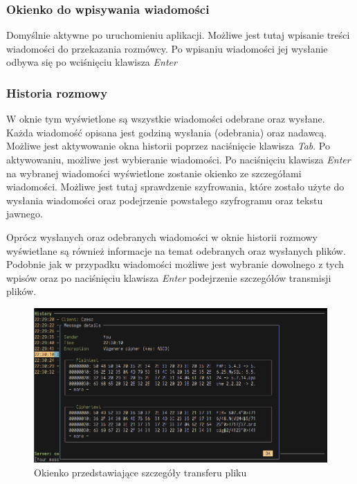 \documentclass{article}
\begin{document}
    \subsubsection{Okienko do wpisywania wiadomości}
      Domyślnie aktywne po uruchomieniu aplikacji. Możliwe jest tutaj wpisanie treści wiadomości do przekazania
      rozmówcy. Po wpisaniu wiadomości jej wysłanie odbywa się po wciśnięciu klawisza \emph{Enter}
    \subsubsection{Historia rozmowy}
      W oknie tym wyświetlone są wszystkie wiadomości odebrane oraz wysłane. Każda wiadomość opisana jest godziną
      wysłania (odebrania) oraz nadawcą. Możliwe jest aktywowanie okna historii poprzez naciśnięcie klawisza
      \emph{Tab}. Po aktywowaniu, możliwe jest wybieranie wiadomości. Po naciśnięciu klawisza \emph{Enter} na
      wybranej wiadomości wyświetlone zostanie okienko ze szczegółami wiadomości. Możliwe jest tutaj sprawdzenie
      szyfrowania, które zostało użyte do wysłania wiadomości oraz podejrzenie powstałego szyfrogramu oraz tekstu
      jawnego.

      Oprócz wysłanych oraz odebranych wiadomości w oknie historii rozmowy wyświetlane są również informacje na
      temat odebranych oraz wysłanych plików. Podobnie jak w przypadku wiadomości możliwe jest wybranie dowolnego
      z tych wpisów oraz po naciśnięciu klawisza \emph{Enter} podejrzenie szczegółów transmisji plików.

    \begin{figure}[H]
        \centering
        \includegraphics[scale=0.4]{szczegoly_transferu_pliku}
        \caption{Okienko przedstawiające szczegóły transferu pliku}
        \label{FILE_TRANSFER_DETAILS}
    \end{figure}
\end{document}
